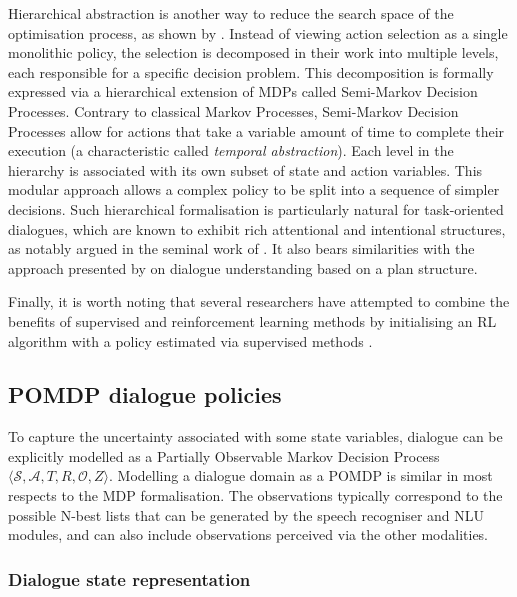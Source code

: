 Hierarchical abstraction is another way to reduce the search space of the optimisation process, as shown by \cite{Heriberto2011}. Instead of viewing action selection as a single monolithic policy, the selection is decomposed in their work into multiple levels, each responsible for a specific decision problem.  This decomposition is formally expressed via a hierarchical extension of MDPs called Semi-Markov Decision Processes.  Contrary to classical Markov Processes, Semi-Markov Decision Processes allow for actions that take a variable amount of time to complete their execution (a characteristic called \textit{temporal abstraction}). Each level in the hierarchy is associated with its own subset of state and action variables.  This modular approach allows a complex policy to be split into a sequence of simpler decisions.  Such hierarchical formalisation is particularly natural for task-oriented dialogues, which are known to exhibit rich attentional and intentional structures, as notably argued in the seminal work of \cite{Grosz:1986}. It also bears similarities with the approach presented by \cite{Litman87} on dialogue understanding based on a plan structure. 

Finally, it is worth noting that several researchers have attempted to combine the benefits of supervised and reinforcement learning methods by initialising an RL algorithm with a policy estimated via supervised methods \citep{williams2003, rieser2006}.

\subsection{POMDP dialogue policies}

To capture the uncertainty associated with some state variables, dialogue can be explicitly modelled as a Partially Observable Markov Decision Process $\langle \mathcal{S}, \mathcal{A}, T, R, \mathcal{O}, Z \rangle$.  Modelling a dialogue domain as a POMDP is similar in most respects to the MDP formalisation.  The observations typically correspond to the possible N-best lists that can be generated by the speech recogniser and NLU modules, and can also include observations perceived via the other modalities.  

\subsubsection*{Dialogue state representation}

